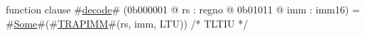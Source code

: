 function clause #\hyperref[zdecode]{decode}# (0b000001 @ rs : regno @ 0b01011 @ imm : imm16) =
  #\hyperref[zSome]{Some}#(#\hyperref[zTRAPIMM]{TRAPIMM}#(rs, imm, LTU)) /* TLTIU */

